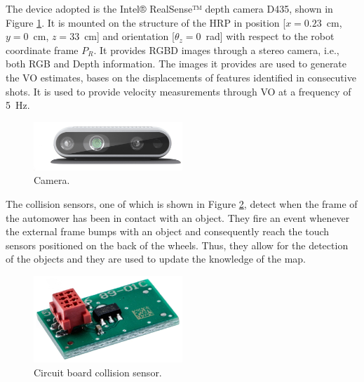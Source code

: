 The device adopted is the Intel® RealSense™ depth camera D435, shown in Figure \ref{fig:camera_sensor}.
It is mounted on the structure of the \gls{HRP} in position [$x=0.23$\SI{}{cm}, $y=0$\SI{}{cm}, $z= 33$\SI{}{cm}] and orientation [$\theta_z=0$\SI{}{rad}] with respect to the robot coordinate frame $P_R$.
It provides \gls{RGBD} images through a stereo camera, i.e., both \gls{RGB} and Depth information.
The images it provides are used to generate the \gls{VO} estimates, bases on the displacements of features identified in consecutive shots.
It is used to provide velocity measurements through \gls{VO} at a frequency of \SI{5}{Hz}.
\begin{figure}[!ht]
	\begin{center}
			\begin{center}
				\includegraphics[width=0.5\textwidth]{Images/4-Methods/d435i-1.png}
			\end{center}
		\caption{Camera.}
		\label{fig:camera_sensor}
	\end{center}
\end{figure}


The collision sensors, one of which is shown in Figure \ref{fig:collision_sensor}, detect when the frame of the automower has been in contact with an object.
They fire an event whenever the external frame bumps with an object and consequently reach the touch sensors positioned on the back of the wheels.
Thus, they allow for the detection of the objects and they are used to update the knowledge of the map.
\begin{figure}[!ht]
	\begin{center}
			\begin{center}
				\includegraphics[width=0.5\textwidth]{Images/3-0-SetUp/Collision.png}
			\end{center}
		\caption{Circuit board collision sensor.}
		\label{fig:collision_sensor}
	\end{center}
\end{figure}


